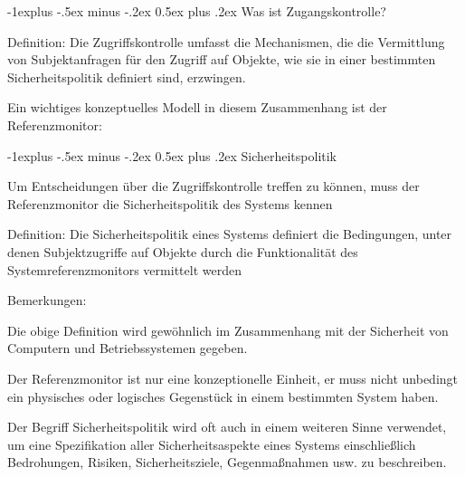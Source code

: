 \documentclass[a4paper]{article}
\makeatletter
\renewcommand{\subsection}{\@startsection{subsection}{2}{0mm}%
 {-1explus -.5ex minus -.2ex}%
 {0.5ex plus .2ex}%
 {\normalfont\normalsize\bfseries}}
\makeatother
\begin{document}
\begin{multicols}{3}
      \subsection{Was ist Zugangskontrolle?}

      \begin{itemize*}
            \item
            Definition: Die Zugriffskontrolle umfasst die Mechanismen, die die
            Vermittlung von Subjektanfragen für den Zugriff auf Objekte, wie sie
            in einer bestimmten Sicherheitspolitik definiert sind, erzwingen.
            \item
            Ein wichtiges konzeptuelles Modell in diesem Zusammenhang ist der
            Referenzmonitor:
      \end{itemize*}


      \subsection{Sicherheitspolitik}

      \begin{itemize*}
            \item
            Um Entscheidungen über die Zugriffskontrolle treffen zu können, muss
            der Referenzmonitor die Sicherheitspolitik des Systems kennen
            \item
            Definition: Die Sicherheitspolitik eines Systems definiert die
            Bedingungen, unter denen Subjektzugriffe auf Objekte durch die
            Funktionalität des Systemreferenzmonitors vermittelt werden
            \item
            Bemerkungen:

            \begin{itemize*}
                  \item Die obige Definition wird gewöhnlich im Zusammenhang mit der Sicherheit von Computern und Betriebssystemen gegeben.
                  \item Der Referenzmonitor ist nur eine konzeptionelle Einheit, er muss nicht unbedingt ein physisches oder logisches Gegenstück in einem bestimmten System haben.
                  \item Der Begriff Sicherheitspolitik wird oft auch in einem weiteren Sinne verwendet, um eine Spezifikation aller Sicherheitsaspekte eines Systems einschließlich Bedrohungen, Risiken, Sicherheitsziele, Gegenmaßnahmen usw. zu beschreiben.
            \end{itemize*}
      \end{itemize*}



\end{multicols}
\end{document}
